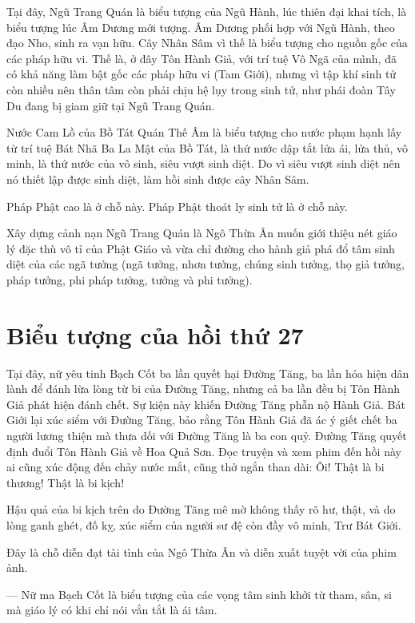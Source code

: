 Tại đây, Ngũ Trang Quán là biểu tượng của Ngũ Hành, lúc thiên đại khai tích, là biểu tượng lúc Âm Dương mới tượng. Âm Dương phối hợp với Ngũ Hành, theo đạo Nho, sinh ra vạn hữu. Cây Nhân Sâm vì thế là biểu tượng cho nguồn gốc của các pháp hữu vi. Thế là, ở đây Tôn Hành Giả, với trí tuệ Vô Ngã của mình, đã có khả năng làm bật gốc các pháp hữu vi (Tam Giới), nhưng vì tập khí sinh tử còn nhiều nên thân tâm còn phải chịu hệ lụy trong sinh tử, như phái đoàn Tây Du đang bị giam giữ tại Ngũ Trang Quán.

Nước Cam Lồ của Bồ Tát Quán Thế Âm là biểu tượng cho nước phạm hạnh lấy từ trí tuệ Bát Nhã Ba La Mật của Bồ Tát, là thứ nước dập tắt lửa ái, lửa thủ, vô minh, là thứ nước của vô sinh, siêu vượt sinh diệt. Do vì siêu vượt sinh diệt nên nó thiết lập được sinh diệt, làm hồi sinh được cây Nhân Sâm.

Pháp Phật cao là ở chỗ này. Pháp Phật thoát ly sinh tử là ở chỗ này.

Xây dựng cảnh nạn Ngũ Trang Quán là Ngô Thừa Ân muốn giới thiệu nét giáo lý đặc thù vô tỉ của Phật Giáo và vừa chỉ đường cho hành giả phá đổ tâm sinh diệt của các ngã tưởng (ngã tưởng, nhơn tưởng, chúng sinh tưởng, thọ giả tưởng, pháp tưởng, phi pháp tưởng, tưởng và phi tưởng).

\section{Biểu tượng của hồi thứ 27} %
\label{sec:bieu_tuong_cua_hoi_thu_27}

Tại đây, nữ yêu tinh Bạch Cốt ba lần quyết hại Đường Tăng, ba lần hóa hiện dân lành để đánh lừa lòng từ bi của Đường Tăng, nhưng cả ba lần đều bị Tôn Hành Giả phát hiện đánh chết. Sự kiện này khiến Đường Tăng phẫn nộ Hành Giả. Bát Giới lại xúc siểm với Đường Tăng, bảo rằng Tôn Hành Giả đã ác ý giết chết ba người lương thiện mà thưa dối với Đường Tăng là ba con quỷ. Đường Tăng quyết định đuổi Tôn Hành Giả về Hoa Quả Sơn. Đọc truyện và xem phim đến hồi này ai cũng xúc động đến chảy nước mắt, cũng thở ngắn than dài: Ôi! Thật là bi thương! Thật là bi kịch!

Hậu quả của bi kịch trên do Đường Tăng mê mờ không thấy rõ hư, thật, và do lòng ganh ghét, đố kỵ, xúc siểm của người sư đệ còn đầy vô minh, Trư Bát Giới.

Đây là chỗ diễn đạt tài tình của Ngô Thừa Ân và diễn xuất tuyệt vời của phim ảnh.

— Nữ ma Bạch Cốt là biểu tượng của các vọng tâm sinh khởi từ tham, sân, si mà giáo lý có khi chỉ nói vắn tắt là ái tâm.

